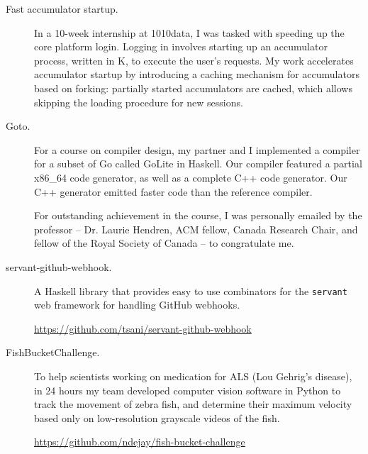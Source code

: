 \documentclass{article}
\begin{document}
\begin{description}
  \item[Fast accumulator startup.]
    In a 10-week internship at 1010data, I was tasked with speeding up the
    core platform login. Logging in involves starting up an accumulator
    process, written in K, to execute the user's requests. My work
    accelerates accumulator startup by introducing a caching mechanism for
    accumulators based on forking: partially started accumulators are
    cached, which allows skipping the loading procedure for new sessions.

  \item[Goto.]
     For a course on compiler design, my partner and I implemented a compiler
     for a subset of Go called GoLite in Haskell. Our compiler featured a
     partial x86\_64 code generator, as well as a complete C++ code generator.
     Our C++ generator emitted faster code than the reference compiler.

     For outstanding achievement in the course, I was personally emailed by the
     professor -- Dr. Laurie Hendren, ACM fellow, Canada Research Chair, and
     fellow of the Royal Society of Canada -- to congratulate me.

  \item[servant-github-webhook.] A Haskell library that provides easy to
    use combinators for the \texttt{servant} web framework for handling
    GitHub webhooks.

    \url{https://github.com/tsani/servant-github-webhook}



  \item[FishBucketChallenge.]
    To help scientists working on medication for ALS (Lou Gehrig's disease), in
    24 hours my team developed computer vision software in Python to track the
    movement of zebra fish, and determine their maximum velocity based only on
    low-resolution grayscale videos of the fish.

    \url{https://github.com/ndejay/fish-bucket-challenge}



\end{description}
\end{document}
